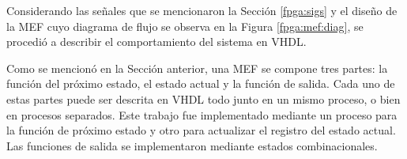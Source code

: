 Considerando las señales que se mencionaron la Sección \ref{fpga:sigs} y el diseño de la MEF cuyo diagrama de flujo se observa en la Figura \ref{fpga:mef:diag}, se procedió a describir el comportamiento del sistema en VHDL.

%
%

Como se mencionó en la Sección anterior, una MEF se compone tres partes: la función del próximo estado, el estado actual y la función de salida. Cada uno de estas partes puede ser descrita en VHDL todo junto en un mismo proceso, o bien en procesos separados. Este trabajo fue implementado mediante un proceso para la función de próximo estado y otro para actualizar el registro del estado actual. Las funciones de salida se implementaron mediante estados combinacionales.

